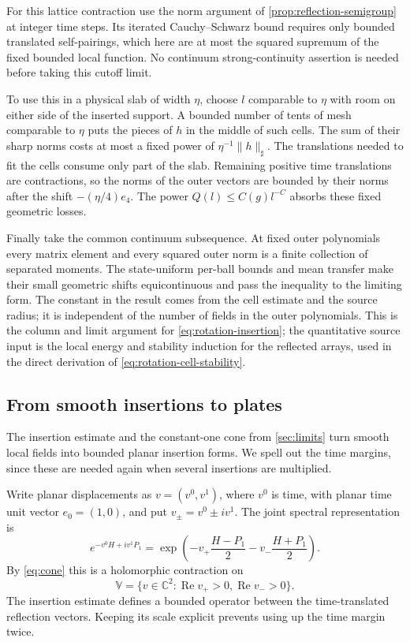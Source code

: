 \documentclass[11pt,letterpaper,reqno]{amsart}
\theoremstyle{definition}
\theoremstyle{remark}
\begin{document}
For this lattice contraction use the norm argument of
\cref{prop:reflection-semigroup} at integer time steps. Its iterated
Cauchy--Schwarz bound requires only bounded translated self-pairings,
which here are at most the squared supremum of the fixed bounded
local function. No continuum strong-continuity assertion is needed
before taking this cutoff limit.

To use this in a physical slab of width $\eta$, choose $l$ comparable
to $\eta$ with room on either side of the inserted support. A bounded
number of tents of mesh comparable to $\eta$ puts the pieces of $h$
in the middle of such cells. The sum of their sharp norms costs at
most a fixed power of $\eta^{-1}\|h\|_\sharp$. The translations
needed to fit the cells consume only part of the slab. Remaining
positive time translations are contractions, so the norms of the outer
vectors are bounded by their norms after the shift $-(\eta/4)e_4$.
The power $Q(l)\le C(g)l^{-C}$ absorbs these fixed geometric losses.

Finally take the common continuum subsequence. At fixed outer
polynomials every matrix element and every squared outer norm is a
finite collection of separated moments. The state-uniform per-ball
bounds and mean transfer make their small geometric shifts
equicontinuous and pass the inequality to the limiting form. The
constant in the result comes from the cell estimate and the source
radius; it is independent of the number of fields in the outer
polynomials. This is the column and limit argument for
\eqref{eq:rotation-insertion}; the quantitative source input is the local energy and stability
induction for the reflected arrays, used in the direct derivation
of \eqref{eq:rotation-cell-stability}.


\subsection{From smooth insertions to plates}

The insertion estimate and the constant-one cone from
\cref{sec:limits} turn smooth local fields into bounded planar
insertion forms. We spell out the time margins, since these are
needed again when several insertions are multiplied.

Write planar displacements as $v=(v^0,v^1)$, where $v^0$ is time,
with planar time unit vector $e_0=(1,0)$,
and put $v_\pm=v^0\pm iv^1$. The joint spectral representation is
\[
 e^{-v^0H+iv^1P_1}
 =\exp\!\left(-v_+\frac{H-P_1}{2}
              -v_-\frac{H+P_1}{2}\right).
\]
By \eqref{eq:cone} this is a holomorphic contraction on
\begin{equation}\label{eq:rotation-tube}
 \mathbb V=\{v\in\mathbb C^2:
                    \operatorname{Re}v_+>0,
                    \operatorname{Re}v_->0\}.
\end{equation}
The insertion estimate defines a bounded operator between the
time-translated reflection vectors. Keeping its scale explicit
prevents using up the time margin twice.
\end{document}
